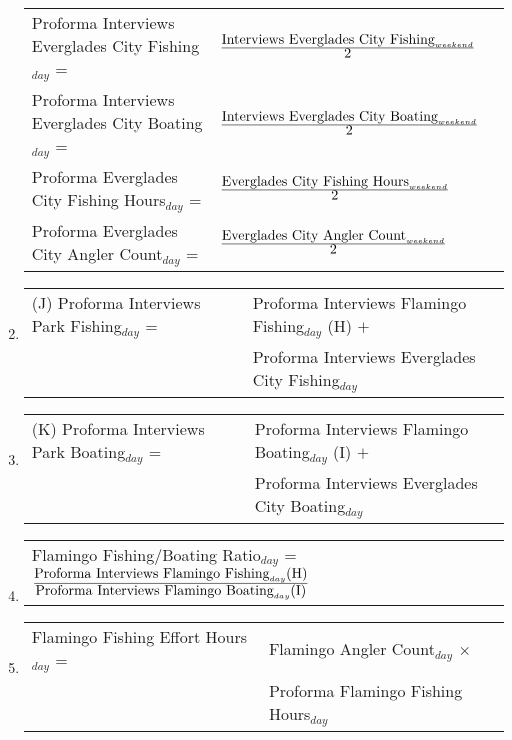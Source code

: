 \documentclass[letterpaper,12pt]{article}
\newcommand{\fraction}[1]{\textrm{\normalsize{#1}}}
\begin{document}
\begin{enumerate}
\begin{tabular}{l@{ }l@{ }l}
	Proforma Interviews Everglades City Fishing$_{day}$ =
		& $
\frac
	{\fraction{Interviews Everglades City Fishing}_{weekend}}
      	{\fraction{2}}
		$ \\

	Proforma Interviews Everglades City Boating$_{day}$ =
		& $
\frac
	{\fraction{Interviews Everglades City Boating}_{weekend}}
      	{\fraction{2}}
		$ \\

	Proforma Everglades City Fishing Hours$_{day}$ =
		& $
\frac
	{\fraction{Everglades City Fishing Hours}_{weekend}}
	{\fraction{2}}
		$ \\

	Proforma Everglades City Angler Count$_{day}$ =
		& $
\frac
	{\fraction{Everglades City Angler Count}_{weekend}}
	{\fraction{2}}
		$ \\
\end{tabular}

\item
\begin{tabular}{l@{ }l@{ }l}
	(J) Proforma Interviews Park Fishing$_{day}$ =
		& Proforma Interviews Flamingo Fishing$_{day}$ (H) $+$ \\
		& Proforma Interviews Everglades City Fishing$_{day}$
\end{tabular}

\item
\begin{tabular}{l@{ }l@{ }l}
	(K) Proforma Interviews Park Boating$_{day}$ =
		& Proforma Interviews Flamingo Boating$_{day}$ (I) $+$ \\
		& Proforma Interviews Everglades City Boating$_{day}$
\end{tabular}

\item
\begin{tabular}{l@{ }}
	Flamingo Fishing/Boating Ratio$_{day}$ =
		$
\frac
	{\fraction{Proforma Interviews Flamingo Fishing}_{day} \fraction{(H)}}
      	{\fraction{Proforma Interviews Flamingo Boating}_{day} \fraction{(I)}}
		$
\end{tabular}

\item
\begin{tabular}{l@{ }l@{ }}
	Flamingo Fishing Effort Hours$_{day}$ =
		& Flamingo Angler Count$_{day}$ $\times$ \\
		& Proforma Flamingo Fishing Hours$_{day}$ \\
\end{tabular}


\end{enumerate}
\end{document}
